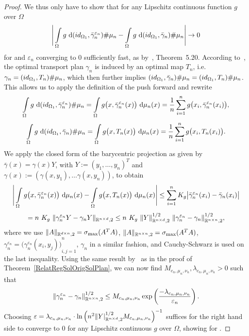 \begin{proof}
	We thus only have to show that for any Lipschitz continuous function $g$ over $\Omega$
	\[ \Bigg\lvert \int\limits_{\Omega} g~\D[{\push[(id_{\Omega_1}, \bar{\gamma}_n^{\varepsilon_n})]{\mu_n}}] - \int\limits_{\Omega} g~\D[{\push[(id_{\Omega_1}, \bar{\gamma}_n)]{\mu_n}}] \Bigg\rvert \rightarrow 0 \]
	for \Ninf{} and $\varepsilon_n$ converging to $0$ sufficiently fast, as  by~\cite{Vill2009}, Theorem~5.20. According to~\cite{Seg2018}, the optimal transport plan $\gamma_n$ is induced by an optimal map $T_n$, i.e.~$\gamma_n = \push[(id_{\Omega_1}, T_n)]{\mu_n}$, which then further implies $\push[(id_{\Omega_1}, \bar{\gamma}_n)]{\mu_n} = \push[(id_{\Omega_1}, T_n)]{\mu_n}$. This allows us to apply the definition of the push forward and rewrite
	\[ \int\limits_{\Omega} g~\D[{\push[(id_{\Omega_1}, \bar{\gamma}_n^{\varepsilon_n})]{\mu_n}}] = \int\limits_{\Omega} g\big( x, \bar{\gamma}_n^{\varepsilon_n}(x) \big)~\Dx{\mu_n} = \frac{1}{n} \sum\limits_{i = 1}^n g\big( x_i, \bar{\gamma}_n^{\varepsilon_n}(x_i) \big), \]
	\[ \int\limits_{\Omega} g~\D[{\push[(id_{\Omega_1}, \bar{\gamma}_n)]{\mu_n}}] = \int\limits_{\Omega} g\big( x, T_n(x) \big)~\Dx{\mu_n} = \frac{1}{n} \sum\limits_{i = 1}^n g\big( x_i, T_n(x_i) \big). \]
	We apply the closed form of the barycentric projection as given by~\cite{Seg2018} $\bar{\gamma}(x) = \gamma(x) Y$, with $Y := {(y_1, \dots, y_n)}^T$ and $\gamma(x) := (\gamma(x, y_1), \dots \gamma(x, y_n))$, to obtain
	\[ \Bigg\lvert \int\limits_{\Omega} g\big( x, \bar{\gamma}_n^{\varepsilon_n}(x) \big)~\Dx{\mu_n} - \int\limits_{\Omega} g\big( x, T_n(x) \big)~\Dx{\mu_n} \Bigg\rvert \le \sum\limits_{i = 1}^n K_g \big\vert \bar{\gamma}_n^{\varepsilon_n}(x_i) - \bar{\gamma}_n(x_i) \big\vert \]
	\[ = n~K_g~\Vert \gamma_n^{\varepsilon_n} Y - \gamma_n Y \Vert_{\R^{n \times d}, 2} \le n~K_g~\Vert Y \Vert_{\R^{n \times d}, 2}^{1/2}~\Vert \gamma_n^{\varepsilon_n} - \gamma_n \Vert^{1/2}_{\R^{n \times n}, 2}, \]
	where we use $\Vert A \Vert_{\R^{d \times n}, 2} = \sigma_{\max}(A^T A)$, $\Vert A \Vert_{\R^{n \times n}, 2} = \sigma_{\max}(A^T A)$, $\gamma_n^{\varepsilon_n} = {\big( \gamma_n^{\varepsilon_n}(x_i, y_j) \big)}_{i, j = 1}^n$, $\gamma_n$ in a similar fashion, and Cauchy-Schwarz is used on the last inequality. Using the same result by~\cite{Comi1994} as in the proof of Theorem~\ref{RelatRegSolOrigSolPlan}, we can now find $M_{c_n, \mu_n, \nu_n}, \lambda_{c_n, \mu_n, \nu_n} > 0$ such that
	\[ \Vert \gamma_n^{\varepsilon_n} - \gamma_n \Vert^{1/2}_{\R^{n \times n}, 2} \le M_{c_n, \mu_n, \nu_n} \exp\left( \frac{-\lambda_{c_n, \mu_n, \nu_n}}{\varepsilon_n} \right). \]
	Choosing $\varepsilon = \lambda_{c_n, \mu_n, \nu_n} \cdot {\ln\left( n^2 \Vert Y \vert^{1/2}_{\R^{n \times d}, 2} M_{c_n, \mu_n, \nu_n} \right)}^{-1}$ suffices for the right hand side to converge to $0$ for any Lipschitz continuous $g$ over $\Omega$, showing  for \Ninf.
\end{proof}

